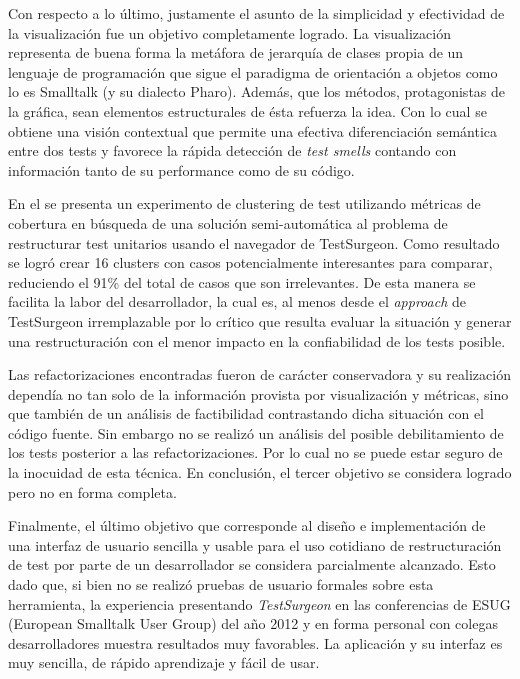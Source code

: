 \par Con respecto a lo último, justamente el asunto de la simplicidad y efectividad de la visualización fue un objetivo completamente logrado. La visualización representa de buena forma la metáfora de jerarquía de clases propia de un lenguaje de programación que sigue el paradigma de orientación a objetos como lo es Smalltalk (y su dialecto Pharo). Además, que los métodos, protagonistas de la gráfica, sean elementos estructurales de ésta refuerza la idea. Con lo cual se obtiene una visión contextual que permite una efectiva diferenciación semántica entre dos tests y favorece la rápida detección de \emph{test smells} contando con información tanto de su performance como de su código.

\par En el  se presenta un experimento de clustering de test utilizando métricas de cobertura en búsqueda de una solución semi-automática al problema de restructurar test unitarios usando el navegador de TestSurgeon. Como resultado se logró crear 16 clusters con casos potencialmente interesantes para comparar, reduciendo el 91\% del total de casos que son irrelevantes. De esta manera se facilita la labor del desarrollador, la cual es, al menos desde el \emph{approach} de TestSurgeon irremplazable por lo crítico que resulta evaluar la situación y generar una restructuración con el menor impacto en la confiabilidad de los tests posible.

\par Las refactorizaciones encontradas fueron de carácter conservadora y su realización dependía no tan solo de la información provista por visualización y métricas, sino que también de un análisis de factibilidad contrastando dicha situación con el código fuente. Sin embargo no se realizó un análisis del posible debilitamiento de los tests posterior a las refactorizaciones. Por lo cual no se puede estar seguro de la inocuidad de esta técnica. En conclusión, el tercer objetivo se considera logrado pero no en forma completa.

\par Finalmente, el último objetivo que corresponde al diseño e implementación de una interfaz de usuario sencilla y usable para el uso cotidiano de restructuración de test por parte de un desarrollador se considera parcialmente alcanzado. Esto dado que, si bien no se realizó pruebas de usuario formales sobre esta herramienta, la experiencia presentando \emph{TestSurgeon} en las conferencias de ESUG (European Smalltalk User Group) del año 2012 y en forma personal con colegas desarrolladores muestra resultados muy favorables. La aplicación y su interfaz es muy sencilla, de rápido aprendizaje y fácil de usar.

